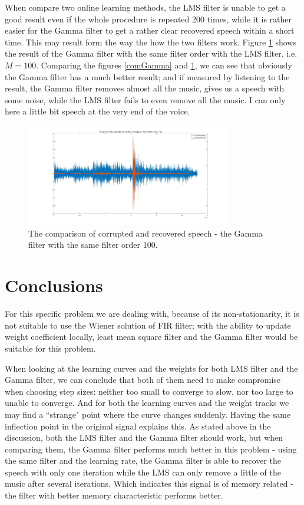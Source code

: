 \documentclass[conference]{IEEEtran}
\begin{document}
	When compare two online learning methods, the LMS filter is unable to get a good result even if the whole procedure is repeated 200 times, while it is rather easier for the Gamma filter to get a rather clear recovered speech within a short time. This may result form the way the how the two filters work. Figure \ref{gamma100} shows the result of the Gamma filter with the same filter order with the LMS filter, i.e. $M = 100$. Comparing the figures \ref{comGamma} and \ref{gamma100}, we can see that obviously the Gamma filter has a much better result; and if measured by listening to the result, the Gamma filter removes almost all the music, gives us a speech with some noise, while the LMS filter fails to even remove all the music. I can only here a little bit speech at the very end of the voice.
	\begin{figure}[htbp]
	\centerline{\includegraphics[width=3.5in]{Gamma_eta0005_mu02_M100.jpg}}
	\caption{The comparison of corrupted and recovered speech - the Gamma filter with the same filter order 100.}
	\label{gamma100}
	\end{figure}

\section{Conclusions}  For this specific problem we are dealing with, because of its non-stationarity, it is not suitable to use the Wiener solution of FIR filter; with the ability to update weight coefficient locally, least mean square filter and the Gamma filter would be suitable for this problem. 

	When looking at the learning curves and the weights for both LMS filter and the Gamma filter, we can conclude that both of them need to make compromise when choosing step sizes: neither too small to converge to slow, nor too large to unable to converge. And for both the learning curves and the weight tracks we may find a ``strange" point where the curve changes suddenly.  Having the same inflection point in the original signal explains this. As stated above in the discussion, both the LMS filter and the Gamma filter should work, but when comparing them, the Gamma filter performs much better in this problem - using the same filter and the learning rate, the Gamma filter is able to recover the speech with only one iteration while the LMS can only remove a little of the music after several iterations. Which indicates this signal is of memory related - the filter with better memory characteristic performs better.
	
\end{document}
